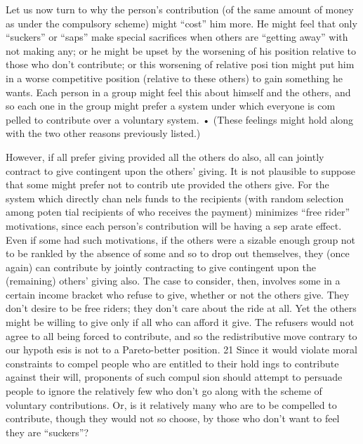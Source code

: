 \documentclass[11pt,openany]{book}
\begin{document}
Let us now turn to why the person's contribution (of the same amount of money as under the compulsory scheme) might ``cost'' him more. He might feel that only ``suckers'' or ``saps'' make special sacrifices when others are ``getting away'' with not making any; or he might be upset by the worsening of his position relative to those who don't contribute; or this worsening of relative posi tion might put him in a worse competitive position (relative to these others) to gain something he wants. Each person in a group might feel this about himself and the others, and so each one in the group might prefer a system under which everyone is com pelled to contribute over a voluntary system. • (These feelings might hold along with the two other reasons previously listed.) 

However, if all prefer giving provided all the others do also, all can jointly contract to give contingent upon the others' giving. It is not plausible to suppose that some might prefer not to contrib ute provided the others give. For the system which directly chan nels funds to the recipients (with random selection among poten tial recipients of who receives the payment) minimizes ``free rider'' motivations, since each person's contribution will be having a sep arate effect. Even if some had such motivations, if the others were a sizable enough group not to be rankled by the absence of some and so to drop out themselves, they (once again) can contribute by jointly contracting to give contingent upon the (remaining) others' giving also. The case to consider, then, involves some in a certain income bracket who refuse to give, whether or not the others give. They don't desire to be free riders; they don't care about the ride at all. Yet the others might be willing to give only if all who can afford it give. The refusers would not agree to all being forced to contribute, and so the redistributive move contrary to our hypoth esis is not to a Pareto-better position. 21 Since it would violate moral constraints to compel people who are entitled to their hold ings to contribute against their will, proponents of such compul sion should attempt to persuade people to ignore the relatively few who don't go along with the scheme of voluntary contributions. Or, is it relatively many who are to be compelled to contribute, though they would not so choose, by those who don't want to feel they are ``suckers''? 
\end{document}
